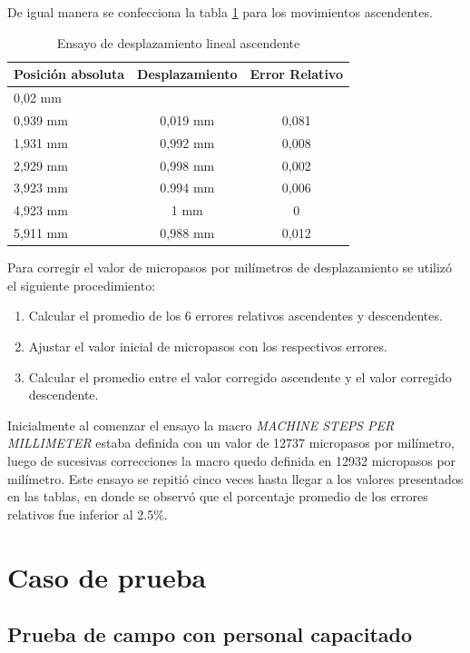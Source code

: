 De igual manera se confecciona la tabla \ref{tab:ensayo_desplazamiento_asc} para los movimientos ascendentes.
 
\begin{table}[h!]
	\centering
	\caption[Ensayo de desplazamiento ascendente]{Ensayo de desplazamiento lineal ascendente}
	\begin{tabular}{l c c }    
		\toprule
		\textbf{Posición absoluta}     & \textbf{Desplazamiento} & \textbf{Error Relativo} \\
		\midrule
		0,02 mm	& 	        	& 	 			 	\\		
		0,939 mm    & 	0,019 mm    	& 	0,081	\\
		1,931 mm 	& 	0,992 mm	    & 	0,008 	\\
		2,929 mm	& 	0,998 mm	    & 	0,002 	\\
		3,923 mm 	& 	0.994 mm        & 	0,006	\\
		4,923 mm 	& 	1 mm	    	& 	0		\\
		5,911 mm 	& 	0,988 mm        & 	0,012 	\\
		\bottomrule
		\hline
	\end{tabular}
	\label{tab:ensayo_desplazamiento_asc}
\end{table}


Para corregir el valor de micropasos por milímetros de desplazamiento se utilizó el siguiente procedimiento:
\begin{enumerate}
\item Calcular el promedio de los 6 errores relativos ascendentes y descendentes.
\item Ajustar el valor inicial de micropasos con los respectivos errores. 
\item Calcular el promedio entre el valor corregido ascendente y el valor corregido descendente.
\end{enumerate}


Inicialmente al comenzar el ensayo la macro \textit{MACHINE STEPS PER MILLIMETER}  estaba definida con un valor de 12737 micropasos por milímetro, luego de sucesivas correcciones la macro quedo definida en 12932 micropasos por milímetro.
Este ensayo se repitió cinco veces hasta llegar a los valores presentados en las tablas, en donde se observó que el porcentaje promedio de los errores relativos fue inferior al 2.5\%.

\section{Caso de prueba}
\subsection{Prueba de campo con personal capacitado}

